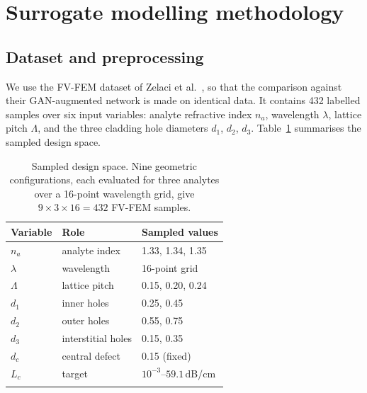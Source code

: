 \documentclass[iicol,pdflatex,sn-basic,Numbered]{sn-jnl}
\begin{document}
\section{Surrogate modelling methodology}\label{sec:method}

\subsection{Dataset and preprocessing}\label{sec:dataset}

We use the FV-FEM dataset of Zelaci et al.~\cite{zelaci2021}, so that the
comparison against their GAN-augmented network is made on identical data. It
contains 432 labelled samples over six input variables: analyte refractive index
$n_a$, wavelength $\lambda$, lattice pitch $\Lambda$, and the three cladding hole
diameters $d_1$, $d_2$, $d_3$. Table~\ref{tab:design} summarises the sampled
design space.

\begin{table}[t]
\caption{Sampled design space. Nine geometric configurations, each evaluated for
three analytes over a 16-point wavelength grid, give $9 \times 3 \times 16 = 432$
FV-FEM samples.}\label{tab:design}
\begin{tabular*}{\columnwidth}{@{\extracolsep\fill}lll}
\toprule
Variable & Role & Sampled values \\
\midrule
$n_a$      & analyte index   & 1.33, 1.34, 1.35 \\
$\lambda$  & wavelength      & 16-point grid \\
$\Lambda$  & lattice pitch   & 0.15, 0.20, 0.24 \\
$d_1$      & inner holes     & 0.25, 0.45 \\
$d_2$      & outer holes     & 0.55, 0.75 \\
$d_3$      & interstitial holes & 0.15, 0.35 \\
$d_c$      & central defect  & 0.15 (fixed) \\
\midrule
$L_c$      & target          & $10^{-3}$--$59.1$\,dB/cm \\
\botrule
\end{tabular*}
\end{table}
\end{document}
